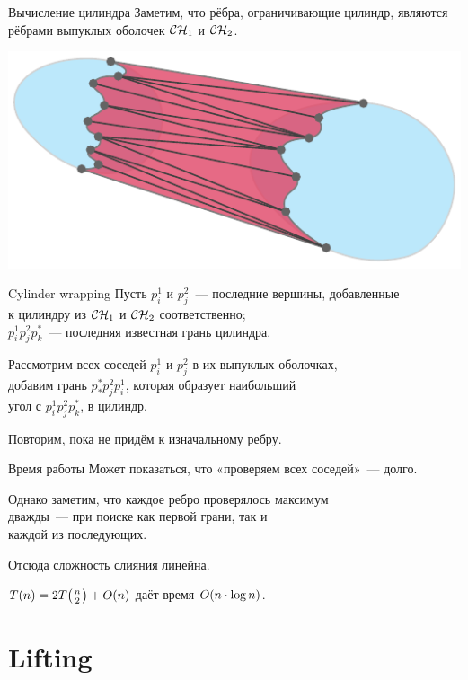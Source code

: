 \begin{frame}{Вычисление цилиндра}
	Заметим, что рёбра, ограничивающие цилиндр, являются \\
	рёбрами выпуклых оболочек \(\mathcal{C}\mathcal{H}_1\) и \(\mathcal{C}\mathcal{H}_2\).
\begin{center} \includegraphics[scale=1.04]{svg/CHconquerPolygonal} \end{center}
\end{frame}


\begin{frame}{Cylinder wrapping}
	Пусть \(p^1_i\) и \(p^2_j\)~— последние вершины, добавленные \\
	к цилиндру из \(\mathcal{C}\mathcal{H}_1\) и \(\mathcal{C}\mathcal{H}_2\) соответственно; \\
	\(p^1_i p^2_j p^*_k\)~— последняя известная грань цилиндра.

	Рассмотрим всех соседей \(p^1_i\) и \(p^2_j\) в их выпуклых оболочках, \\
	добавим грань \(p^*_* p^2_j p^1_i\), которая образует наибольший \\
	угол с \(p^1_i p^2_j p^*_k\), в цилиндр.

	Повторим, пока не придём к изначальному ребру.
\end{frame}


\begin{frame}{Время работы}
	Может показаться, что «проверяем всех соседей»~— долго.

	Однако заметим, что каждое ребро проверялось максимум \\
	дважды~— при поиске как первой грани, так и \\
	каждой из последующих.

	Отсюда сложность слияния линейна.

	\(T(n) = 2 T\lr*{\frac{n}{2}} + O(n)\) даёт время \(O\lr*{n \cdot \log n}\).
\end{frame}


\section{Lifting}

